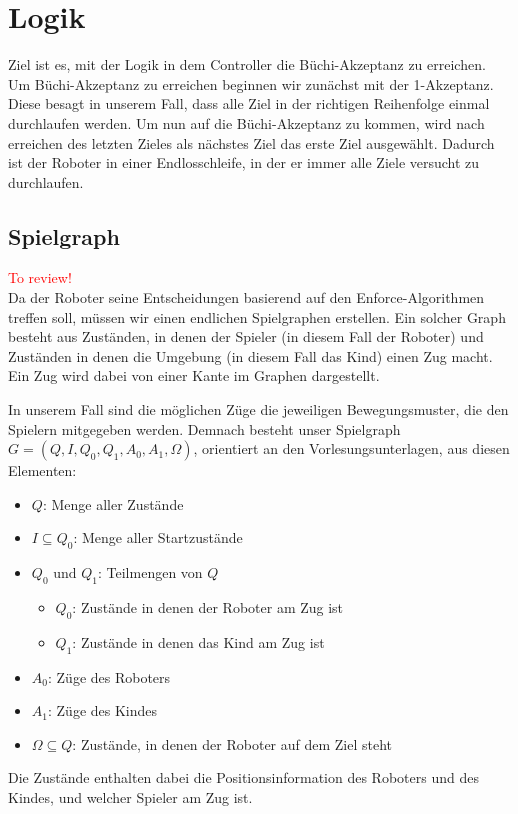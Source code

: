 \section{Logik}
Ziel ist es, mit der Logik in dem Controller die Büchi-Akzeptanz zu erreichen.
Um Büchi-Akzeptanz zu erreichen beginnen wir zunächst mit der 1-Akzeptanz. Diese besagt in unserem Fall, dass alle Ziel in der richtigen Reihenfolge einmal durchlaufen werden. Um nun auf die Büchi-Akzeptanz zu kommen, wird nach erreichen des letzten Zieles als nächstes Ziel das erste Ziel ausgewählt. Dadurch ist der Roboter in einer Endlosschleife, in der er immer alle Ziele versucht zu durchlaufen.
\subsection{Spielgraph}
\textcolor{red}{To review!}\\
Da der Roboter seine Entscheidungen basierend auf den Enforce-Algorithmen treffen soll, müssen wir einen endlichen
Spielgraphen erstellen. Ein solcher Graph besteht aus Zuständen, in denen der Spieler (in diesem Fall der Roboter)
und Zuständen in denen die Umgebung (in diesem Fall das Kind) einen Zug macht. Ein Zug wird dabei von einer Kante im Graphen
dargestellt.\par

In unserem Fall sind die möglichen Züge die jeweiligen Bewegungsmuster, die den Spielern mitgegeben werden.
Demnach besteht unser Spielgraph $G = (Q, I, Q_0, Q_1, A_0, A_1, \Omega)$, orientiert an den Vorlesungsunterlagen, aus diesen Elementen:
\begin{itemize}
	\item $Q$: Menge aller Zustände
	\item $I \subseteq Q_0$: Menge aller Startzustände
	\item $Q_0  \text{ und }  Q_1$: Teilmengen von $Q$
	\begin{itemize}
		\item $Q_0$: Zustände in denen der Roboter am Zug ist
		\item $Q_1$: Zustände in denen das Kind am Zug ist
	\end{itemize}
	\item $A_0$: Züge des Roboters
	\item $A_1$: Züge des Kindes
	\item $\Omega \subseteq Q$: Zustände, in denen der Roboter auf dem Ziel steht
\end{itemize}

Die Zustände enthalten dabei die Positionsinformation des Roboters und des Kindes, und welcher Spieler am Zug ist.


